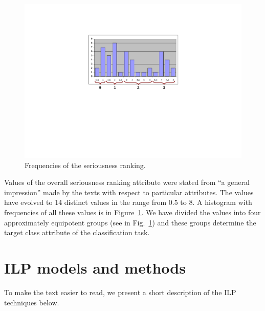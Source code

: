 
\begin{figure}
\centerline{\includegraphics[angle=-90, width=0.6\hsize]{ranking_histogram}}
\caption{Frequencies of the seriousness ranking.}
\label{img:ranking_histogram}
\end{figure}

Values of the overall seriousness ranking attribute were stated from ``a general impression'' made by the texts with respect to particular attributes. %
The values have evolved to 14 distinct values in the range from 0.5 to 8. 
A histogram with frequencies of all these values is in Figure~\ref{img:ranking_histogram}.
We have divided the values into four approximately equipotent groups 
(see in Fig.~\ref{img:ranking_histogram}) 
and these groups determine the target class attribute of the classification task. 








\section{ILP models and methods} \label{sec:ILP}






To make the text easier to read, we present a short description of the ILP techniques below.

